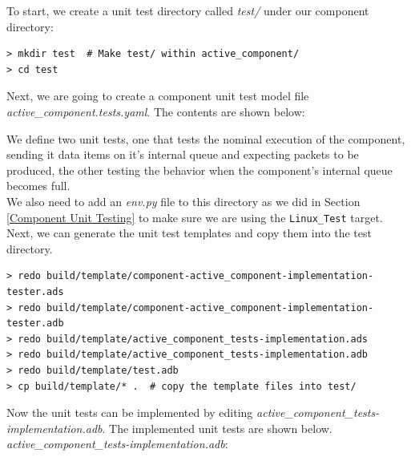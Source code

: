 To start, we create a unit test directory called \textit{test/} under our component directory:

\vspace{5mm} %
\begin{verbatim}
> mkdir test  # Make test/ within active_component/
> cd test
\end{verbatim}
\vspace{5mm} %

Next, we are going to create a component unit test model file \textit{active\_component.tests.yaml}. The contents are shown below:


We define two unit tests, one that tests the nominal execution of the component, sending it data items on it's internal queue and expecting packets to be produced, the other testing the behavior when the component's internal queue becomes full. \\

We also need to add an \textit{env.py} file to this directory as we did in Section \ref{Component Unit Testing} to make sure we are using the \texttt{Linux\_Test} target. \\

Next, we can generate the unit test templates and copy them into the test directory.

\vspace{5mm} %
\begin{verbatim}
> redo build/template/component-active_component-implementation-tester.ads
> redo build/template/component-active_component-implementation-tester.adb
> redo build/template/active_component_tests-implementation.ads
> redo build/template/active_component_tests-implementation.adb
> redo build/template/test.adb
> cp build/template/* .  # copy the template files into test/
\end{verbatim}
\vspace{5mm} %

Now the unit tests can be implemented by editing \textit{active\_component\_tests-implementation.adb}. The implemented unit tests are shown below. \\

\textit{active\_component\_tests-implementation.adb}:

